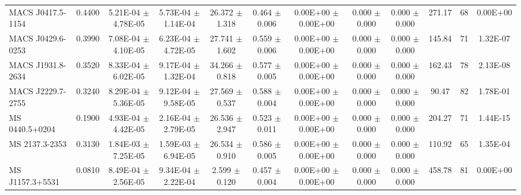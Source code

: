 \documentclass{article}
\begin{document}
\begin{landscape}
\begin{center}
\begin{longtable}{lccccccccccc}
MACS J0417.5-1154   \dotfill &  0.4400     &     5.21E-04  $\pm$    4.78E-05     &     5.73E-04  $\pm$    1.14E-04     &       26.372  $\pm$       1.318     &        0.464  $\pm$       0.006     &     0.00E+00  $\pm$    0.00E+00     &        0.000  $\pm$       0.000     &        0.000  $\pm$       0.000     &   271.17 &    68 &     0.00E+00\\
MACS J0429.6-0253   \dotfill &  0.3990     &     7.08E-04  $\pm$    4.10E-05     &     6.23E-04  $\pm$    4.72E-05     &       27.741  $\pm$       1.602     &        0.559  $\pm$       0.006     &     0.00E+00  $\pm$    0.00E+00     &        0.000  $\pm$       0.000     &        0.000  $\pm$       0.000     &   145.84 &    71 &     1.32E-07\\
MACS J1931.8-2634   \dotfill &  0.3520     &     8.33E-04  $\pm$    6.02E-05     &     9.17E-04  $\pm$    1.32E-04     &       34.266  $\pm$       0.818     &        0.577  $\pm$       0.005     &     0.00E+00  $\pm$    0.00E+00     &        0.000  $\pm$       0.000     &        0.000  $\pm$       0.000     &   162.43 &    78 &     2.13E-08\\
MACS J2229.7-2755   \dotfill &  0.3240     &     8.29E-04  $\pm$    5.36E-05     &     9.12E-04  $\pm$    9.58E-05     &       27.569  $\pm$       0.537     &        0.588  $\pm$       0.004     &     0.00E+00  $\pm$    0.00E+00     &        0.000  $\pm$       0.000     &        0.000  $\pm$       0.000     &    90.47 &    82 &     1.78E-01\\
MS 0440.5+0204      \dotfill &  0.1900     &     4.93E-04  $\pm$    4.42E-05     &     2.16E-04  $\pm$    2.79E-05     &       26.536  $\pm$       2.947     &        0.523  $\pm$       0.011     &     0.00E+00  $\pm$    0.00E+00     &        0.000  $\pm$       0.000     &        0.000  $\pm$       0.000     &   204.27 &    71 &     1.44E-15\\
MS 2137.3-2353      \dotfill &  0.3130     &     1.84E-03  $\pm$    7.25E-05     &     1.59E-03  $\pm$    6.94E-05     &       26.534  $\pm$       0.910     &        0.586  $\pm$       0.005     &     0.00E+00  $\pm$    0.00E+00     &        0.000  $\pm$       0.000     &        0.000  $\pm$       0.000     &   110.92 &    65 &     1.35E-04\\
MS J1157.3+5531     \dotfill &  0.0810     &     8.49E-04  $\pm$    2.56E-05     &     9.34E-04  $\pm$    2.22E-04     &        2.599  $\pm$       0.120     &        0.457  $\pm$       0.004     &     0.00E+00  $\pm$    0.00E+00     &        0.000  $\pm$       0.000     &        0.000  $\pm$       0.000     &   458.78 &    81 &     0.00E+00\\

\end{longtable}
\end{center}
\end{landscape}
\end{document}
